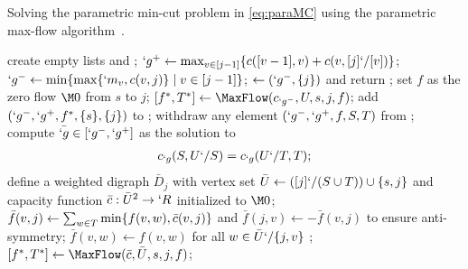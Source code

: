 \documentclass[conference,letterpaper]{IEEEtran}
\begin{document}
\begin{algorithm}[h!]
	\caption{Solving the parametric min-cut problem in \eqref{eq:paraMC} using the parametric max-flow algorithm~\cite{gallo89}.}
	\label{alg:parametric-mf}
	\DontPrintSemicolon
	\SetAlgoLined
	create empty lists  and ;\;
	$
	`g^+\leftarrow \max_{v\in [j-1]}\{c([v-1],v)+c(v,[j]`/[v])\}
	$;
	\label{ln:gamma-plus}\; 
	$
	`g^-\leftarrow \min\{\max\{`m_v,c(v,j)\} \mid v\in [j-1]\}
	$;\label{ln:gamma-minus}\; 
	{
		$\leftarrow (`g^-,\{j\})$ and return ;\label{ln:return1}\;
	}
	{
		set $f$ as the zero flow $\M0$ from $s$ to $j$;\;
		$[f^*,T^*]\leftarrow \MaxFlow(c_{`g^-},U,s,j,f)$;\label{ln:maxflow1}\;
		add $(`g^-,`g^+,f^*,\{s\},\{j\})$ to ;\label{ln:addPL1}\;
	}
	{
		withdraw any element $(`g^-,`g^+,f,S,T)$ from ;\label{ln:retrieve}\;
		compute $\bar{`g}\in [`g^-,`g^+]$ as the solution to %
		\begin{align}
			\label{eq:`gbar}
		c_{`g}(S,U`/S) = c_{`g}(U`/T,T);
		\end{align}
	\vspace{-1em}
		\;
		define a weighted digraph $\bar{D}_j$ with vertex set $\bar{U}\leftarrow ([j]`/(S\cup T)) \cup
		\{s,j\}$ and capacity function $\bar{c}:\bar{U}^2\to `R$ initialized to $\M0$;\;
		{
			$\bar{f}(v,j) \leftarrow  \sum_{w\in T} \min\{f(v,w),\bar{c}(v,j)\}$ and $\bar{f}(j,v)\leftarrow -\bar{f}(v,j)$ to ensure anti-symmetry;\label{ln:barf-j}\;
			$\bar{f}(v,w) \leftarrow f(v,w)$ for all $w\in \bar{U}`/\{j,v\}$ \label{ln:barf-v};\;
		}
		$[f^*,T^*]\leftarrow\MaxFlow(\bar{c},\bar{U},s,j,f)$;\label{ln:maxflow2}\;
	}
\end{algorithm}
\end{document}
